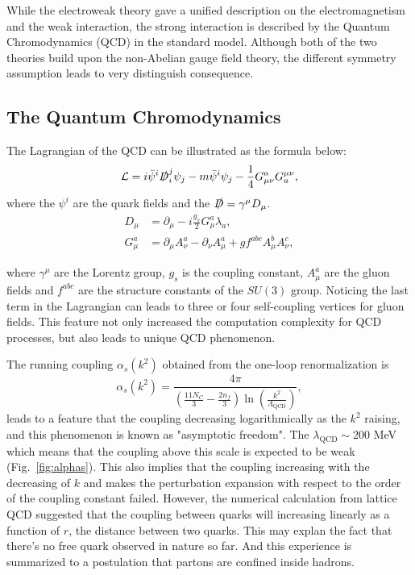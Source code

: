 While the electroweak theory gave a unified description on the electromagnetism and the weak interaction, the strong interaction is described by the Quantum Chromodynamics (QCD) in the standard model. Although both of the two theories build upon the non-Abelian gauge field theory, the different symmetry assumption leads to very distinguish consequence.

\subsection{The Quantum Chromodynamics}
The Lagrangian of the QCD can be illustrated as the formula below:
\begin{equation}
\mathcal{L}=i\bar\psi^i\slashed{D}^{j}_i\psi_j-m\bar\psi^i\psi_j-\frac{1}{4}G^a_{\mu\nu}G_a^{\mu\nu},
\end{equation}
where the $\psi^i$ are the quark fields and the $\slashed{D}=\gamma^\mu D_\mu$. 
\begin{equation}
\begin{aligned}
D_\mu&=\partial_\mu-i\frac{g_s}{2}G^a_\mu\lambda_a,\\
G^a_\mu&=\partial_\mu A_\nu^a-\partial_\nu A^a_\mu+gf^{abc}A^b_\mu A^c_\nu,
\end{aligned}
\end{equation}

where $\gamma^\mu$ are the Lorentz group, $g_s$ is the coupling constant, $A^a_\mu$ are the gluon fields and $f^{abc}$ are the structure constants of the $SU(3)$ group. Noticing the last term in the Lagrangian can leads to three or four self-coupling vertices for gluon fields. This feature not only increased the computation complexity for QCD processes, but also leads to unique QCD phenomenon.

The running coupling $\alpha_s(k^2)$ obtained from the one-loop renormalization is
\begin{equation}
\alpha_s(k^2) = \frac{4\pi}{\left(\frac{11N_C}{3}-\frac{2n_f}{3}\right)\ln\left(\frac{k^2}{\Lambda_{\text{QCD}}}\right)},
\end{equation}
leads to a feature that the coupling decreasing logarithmically as the $k^2$ raising, and this phenomenon is known as "asymptotic freedom". The $\lambda_{\text{QCD}}\sim200$ MeV which means that the coupling above this scale is expected to be weak (Fig.~\ref{fig:alphas}). This also implies that the coupling increasing with the decreasing of $k$ and makes the perturbation expansion with respect to the order of the coupling constant failed. However, the numerical calculation from lattice QCD suggested that the coupling between quarks will increasing linearly as a function of $r$, the distance between two quarks. This may explan the fact that there's no free quark observed in nature so far. And this experience is summarized to a postulation that partons are confined inside hadrons. 

